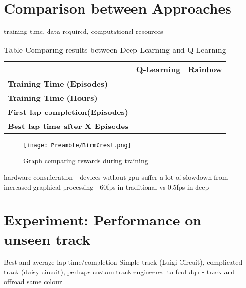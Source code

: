\section{Comparison between Approaches}
training time, data required, computational resources
\begin{table}[h]
    \centering
    \begin{tabular}{l|c|l}
    & \textbf{Q-Learning} & \textbf{Rainbow}\\
    \hline
    \textbf{Training Time (Episodes)}  &   &  \\
    \textbf{Training Time (Hours)}   &  &  \\
    \textbf{First lap completion(Episodes)}   &  &  \\
    \textbf{Best lap time after X Episodes}   &  &  \\
    \end{tabular}
    \caption{Table Comparing results between Deep Learning and Q-Learning}
    \label{tab:rl-comparison}
\end{table}
\begin{figure}
    \centering
    \texttt{[image: Preamble/BirmCrest.png]}
    \caption{Graph comparing rewards during training}
    \label{fig:q-vs-deep-rewards}
\end{figure}

hardware consideration - devices without gpu suffer a lot of slowdown from increased graphical processing - 60fps in traditional vs 0.5fps in deep
\section{Experiment: Performance on unseen track}
Best and average lap time/completion
Simple track (Luigi Circuit), complicated track (daisy circuit), perhaps custom track engineered to fool dqn - track and offroad same colour